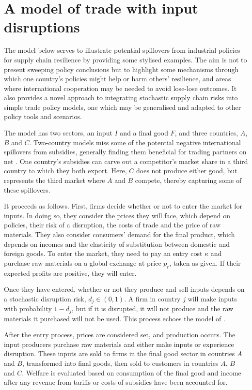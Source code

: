 \documentclass{article}
\begin{document}
\section{A model of trade with input disruptions}

The model below serves to illustrate potential spillovers from industrial policies for supply chain resilience by providing some stylised examples. The aim is not to present sweeping policy conclusions but to highlight some mechanisms through which one country's policies might help or harm others' resilience, and areas where international cooperation may be needed to avoid lose-lose outcomes. It also provides a novel approach to integrating stochastic supply chain risks into simple trade policy models, one which may be generalised and adapted to other policy tools and scenarios.

The model has two sectors, an input $I$ and a final good $F$, and three countries, $A$, $B$ and $C$. Two-country models miss some of the potential negative international spillovers from subsidies, generally finding them beneficial for trading partners on net \parencite{bown_wtoing_2019}. One country's subsidies can carve out a competitor's market share in a third country to which they both export. Here, $C$ does not produce either good, but represents the third market where $A$ and $B$ compete, thereby capturing some of these spillovers. 

It proceeds as follows. First, firms decide whether or not to enter the market for inputs. In doing so, they consider the prices they will face, which depend on policies, their risk of a disruption, the costs of trade and the price of raw materials. They also consider consumers' demand for the final product, which depends on incomes and the elasticity of substitution between domestic and foreign goods. To enter the market, they need to pay an entry cost $\kappa$ and purchase raw materials on a global exchange at price $p_r$, taken as given. If their expected profits are positive, they will enter.

Once they have entered, whether or not they produce and sell inputs depends on a stochastic disruption risk, $d_j \in (0, 1)$. A firm in country $j$ will make inputs with probability $1 - d_j$, but if it is disrupted, it will not produce and the raw materials it purchased will not be used. This process echoes the model of \textcite{bimpikis_supply_2019}.

After the entry process, prices are considered set, and production occurs. The input producers purchase raw materials and either make inputs or experience disruption. These inputs are sold to firms in the final good sector in countries $A$ and $B$, transformed into final goods, then sold to customers in countries $A$, $B$ and $C$. Welfare is evaluated based on consumption of the final good and income after any revenue from tariffs or costs of subsidies have been accounted for. 
\end{document}
